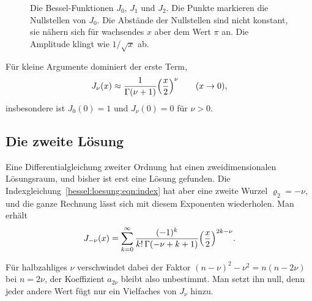\begin{figure}
\centering
{}
\caption{Die Bessel-Funktionen $J_0$, $J_1$ und $J_2$.
Die Punkte markieren die Nullstellen von $J_0$.
Die Abstände der Nullstellen sind nicht konstant, sie nähern sich für wachsendes $x$ aber dem Wert $\pi$ an.
Die Amplitude klingt wie $1/\sqrt{x}$ ab.
\label{bessel:loesung:fig:jnu}}
\end{figure}
Für kleine Argumente dominiert der erste Term,
\begin{equation}
J_\nu(x)
\approx
\frac{1}{\Gamma(\nu+1)}
\Bigl(\frac{x}{2}\Bigr)^{\nu}
\qquad (x\to 0),
\label{bessel:loesung:eqn:kleinx}
\end{equation}
insbesondere ist $J_0(0)=1$ und $J_\nu(0)=0$ für $\nu>0$.

%
%
\subsection{Die zweite Lösung
\label{bessel:loesung:subsection:ynu}}
Eine Differentialgleichung zweiter Ordnung hat einen zweidimensionalen Lösungsraum, und bisher ist erst eine Lösung gefunden.
Die Indexgleichung~\eqref{bessel:loesung:eqn:index} hat aber eine zweite Wurzel $\varrho_2=-\nu$, und die ganze Rechnung lässt sich mit diesem Exponenten wiederholen.
Man erhält
\begin{equation}
J_{-\nu}(x)
=
\sum_{k=0}^\infty
\frac{(-1)^k}{k!\,\Gamma(-\nu+k+1)}
\Bigl(\frac{x}{2}\Bigr)^{2k-\nu}.
\label{bessel:loesung:eqn:jminusnu}
\end{equation}

Für halbzahliges $\nu$ verschwindet dabei der Faktor $(n-\nu)^2-\nu^2=n(n-2\nu)$ bei $n=2\nu$, der Koeffizient $a_{2\nu}$ bleibt also unbestimmt.
Man setzt ihn null, denn jeder andere Wert fügt nur ein Vielfaches von $J_\nu$ hinzu.

